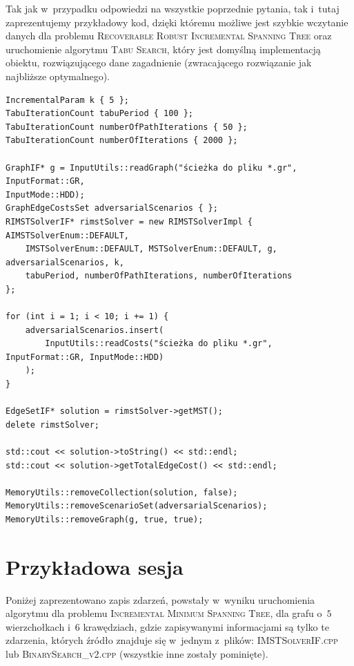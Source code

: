 Tak jak w~przypadku odpowiedzi na wszystkie poprzednie pytania, tak i~tutaj zaprezentujemy przykładowy kod, dzięki któremu możliwe jest szybkie wczytanie danych dla problemu \textsc{Recoverable Robust Incremental Spanning Tree} oraz uruchomienie algorytmu \textsc{Tabu Search}, który jest domyślną implementacją obiektu, rozwiązującego dane zagadnienie (zwracającego rozwiązanie jak najbliższe optymalnego).
\begin{verbatim}
IncrementalParam k { 5 };
TabuIterationCount tabuPeriod { 100 };
TabuIterationCount numberOfPathIterations { 50 };
TabuIterationCount numberOfIterations { 2000 };

GraphIF* g = InputUtils::readGraph("ścieżka do pliku *.gr", InputFormat::GR,
InputMode::HDD);
GraphEdgeCostsSet adversarialScenarios { };
RIMSTSolverIF* rimstSolver = new RIMSTSolverImpl { AIMSTSolverEnum::DEFAULT,
	IMSTSolverEnum::DEFAULT, MSTSolverEnum::DEFAULT, g, adversarialScenarios, k, 
	tabuPeriod, numberOfPathIterations, numberOfIterations
};

for (int i = 1; i < 10; i += 1) {
	adversarialScenarios.insert(
		InputUtils::readCosts("ścieżka do pliku *.gr", InputFormat::GR, InputMode::HDD)
	);
}

EdgeSetIF* solution = rimstSolver->getMST();
delete rimstSolver;

std::cout << solution->toString() << std::endl;
std::cout << solution->getTotalEdgeCost() << std::endl;

MemoryUtils::removeCollection(solution, false);
MemoryUtils::removeScenarioSet(adversarialScenarios);
MemoryUtils::removeGraph(g, true, true);
\end{verbatim}

\section{Przykładowa sesja}\label{sec:logging}

Poniżej zaprezentowano zapis zdarzeń, powstały w~wyniku uruchomienia algorytmu dla problemu \textsc{Incremental Minimum Spanning Tree}, dla grafu o~$5$ wierzchołkach i~$6$ krawędziach, gdzie zapisywanymi informacjami są tylko te zdarzenia, których źródło znajduje się w~jednym z~plików: \textsc{IMSTSolverIF.cpp} lub \textsc{BinarySearch\_v2.cpp} (wszystkie inne zostały pominięte).

